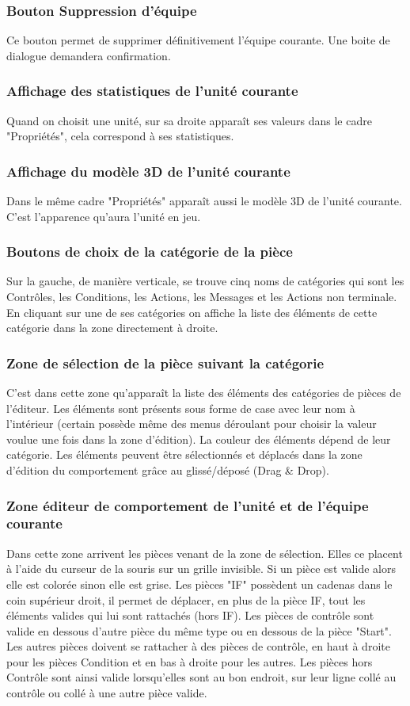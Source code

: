 \documentclass{report}
\begin{document}
\subsubsection{Bouton Suppression d'équipe}
Ce bouton permet de supprimer définitivement l'équipe courante. Une boite de dialogue demandera confirmation.
\subsubsection{Affichage des statistiques de l'unité courante}
Quand on choisit une unité, sur sa droite apparaît ses valeurs dans le cadre "Propriétés", cela correspond à ses statistiques.
\subsubsection{Affichage du modèle 3D de l'unité courante}
Dans le même cadre "Propriétés" apparaît aussi le modèle 3D de l'unité courante. C'est l'apparence qu'aura l'unité en jeu.

\subsubsection{Boutons de choix de la catégorie de la pièce}
Sur la gauche, de manière verticale, se trouve cinq noms de catégories qui sont les Contrôles, les Conditions, les Actions, les Messages et les Actions non terminale. En cliquant sur une de ses catégories on affiche la liste des éléments de cette catégorie dans la zone directement à droite.
\subsubsection{Zone de sélection de la pièce suivant la catégorie}
C'est dans cette zone qu’apparaît la liste des éléments des catégories de pièces de l'éditeur. Les éléments sont présents sous forme de case avec leur nom à l'intérieur (certain possède même des menus déroulant pour choisir la valeur voulue une fois dans la zone d'édition). La couleur des éléments dépend de leur catégorie.
Les éléments peuvent être sélectionnés et déplacés dans la zone d'édition du comportement grâce au glissé/déposé (Drag \& Drop).
\subsubsection{Zone éditeur de comportement de l'unité et de l'équipe courante}
Dans cette zone arrivent les pièces venant de la zone de sélection. Elles ce placent à l'aide du curseur de la souris sur un grille invisible. Si un pièce est valide alors elle est colorée sinon elle est grise. Les pièces "IF" possèdent un cadenas dans le coin supérieur droit, il permet de déplacer, en plus de la pièce IF, tout les éléments valides qui lui sont rattachés (hors IF). Les pièces de contrôle sont valide en dessous d'autre pièce du même type ou en dessous de la pièce "Start". Les autres pièces doivent se rattacher à des pièces de contrôle, en haut à droite pour les pièces Condition et en bas à droite pour les autres. Les pièces hors Contrôle sont ainsi valide lorsqu'elles sont au bon endroit, sur leur ligne collé au contrôle ou collé à une autre pièce valide. 
\end{document}

